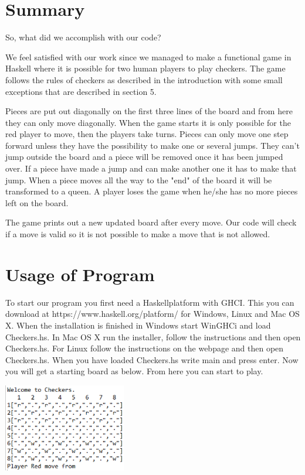 \documentclass[12pt,a4paper]{article}
\begin{document}
\section{Summary}
So, what did we accomplish with our code? 

We feel satisfied with our work since we managed to make a functional game in Haskell where it is possible for two human players to play checkers. The game follows the rules of checkers as described in the introduction with some small exceptions that are described in section 5. 


Pieces are put out diagonally on the first three lines of the board and from here they can only move  diagonally. When the game starts it is only possible for the red player to move, then the players take turns. Pieces can only move one step forward unless they have the possibility to make one or several jumps. They can’t jump outside the board and a piece will be removed once it has been jumped over. If a piece have made a jump and can make another one it has to make that jump. When a piece moves all the way to the "end" of the board it will be transformed to a queen. A player loses the game when he/she has no more pieces left on the board.

The game prints out a new updated board after every move. Our code will check if a move is valid so it is not possible to make a move that is not allowed.

\section{Usage of Program}
To start our program you first need a Haskellplatform with GHCI. This you can download at https://www.haskell.org/platform/ for Windows, Linux and Mac OS X. When the installation is finished in Windows start WinGHCi and load Checkers.hs. In Mac OS X run the installer, follow the instructions and then open Checkers.hs. For Linux follow the instructions on the webpage and then open Checkers.hs.
\newpage
When you have loaded Checkers.hs write main and press enter. Now you will get a starting board as below. From here you can start to play. 		

\begin{center}
	\includegraphics[width= 0.4\textwidth]{start.PNG}
\end{center}
\end{document}
